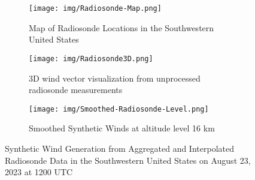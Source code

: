 


\begin{figure}[!ht]
\centering
    \begin{subfigure}[t]{0.4\textwidth}
    \centering
    \texttt{[image: img/Radiosonde-Map.png]}
    \caption{Map of Radiosonde Locations in the Southwestern United States} \label{fig1}
\end{subfigure}\hfill
\begin{subfigure}[t]{0.4\textwidth}
    \centering
    \texttt{[image: img/Radiosonde3D.png]}
    \caption{3D wind vector visualization from unprocessed radiosonde measurements} \label{fig2}
\end{subfigure}\hfill
\begin{subfigure}[t]{0.4\textwidth}
    \centering
    \texttt{[image: img/Smoothed-Radiosonde-Level.png]}
    \caption{Smoothed Synthetic Winds at altitude level 16 km} \label{fig2}
\end{subfigure}\hfill

\caption{Synthetic Wind Generation from Aggregated and Interpolated Radiosonde Data in the Southwestern United States on August
23, 2023 at 1200 UTC}
\label{fig:synthwinds}
\end{figure}

